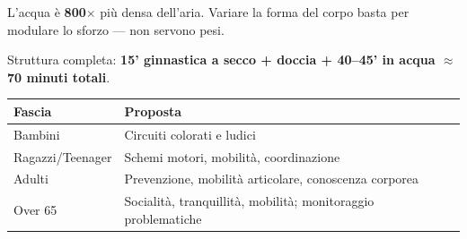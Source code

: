 \documentclass[12pt, a4paper]{article}
\begin{document}
L'acqua è \textbf{800$\times$} più densa dell'aria. Variare la forma del corpo basta per modulare lo sforzo --- non servono pesi.

Struttura completa: \textbf{15' ginnastica a secco + doccia + 40--45' in acqua $\approx$ 70 minuti totali}.

\begin{tabularx}{\textwidth}{lX}
\toprule
\rowcolor{light} \textbf{Fascia} & \textbf{Proposta} \\
\midrule
Bambini & Circuiti colorati e ludici \\
Ragazzi/Teenager & Schemi motori, mobilità, coordinazione \\
Adulti & Prevenzione, mobilità articolare, conoscenza corporea \\
Over 65 & Socialità, tranquillità, mobilità; monitoraggio problematiche \\
\bottomrule
\end{tabularx}
\end{document}
